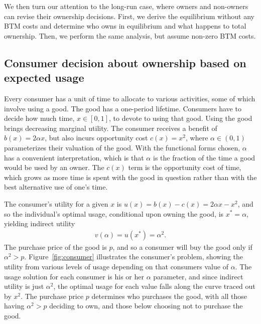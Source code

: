 \documentclass[11pt]{article}
\begin{document}
We then turn our attention to the long-run case, where owners and non-owners can revise their ownership decisions.
First, we derive the equilibrium without any BTM costs and determine who owns in equilibrium and what happens to total ownership.
Then, we perform the same analysis, but assume non-zero BTM costs. 

\subsection{Consumer decision about ownership based on expected usage}  
Every consumer has a unit of time to allocate to various activities, some of which involve using a good.  
The good has a one-period lifetime. 
Consumers have to decide how much time, $x \in [0,1]$, to devote to using that good.
Using the good brings decreasing marginal utility. 
The consumer receives a benefit of $b(x) = 2\alpha x$, but also incurs opportunity cost $c(x) = x^2$,  
where $\alpha \in (0,1)$ parameterizes their valuation of the good.
With the functional forms chosen, $\alpha$ has a convenient interpretation, which is that $\alpha$ is the fraction of the time a good would be used by an owner. 
The $c(x)$ term is the opportunity cost of time, which grows as more time is spent with the good in question rather than with the best alternative use of one's time.

The consumer's utility for a given $x$ is $u(x) = b(x) - c(x) = 2 \alpha x - x^2$, and so the individual's optimal usage, conditional upon owning the good, is $x^* = \alpha$, yielding indirect utility 
\begin{align}
v(\alpha) = u(x^*) = \alpha^2.  
\end{align} 
The purchase price of the good is $p$, and so a consumer will buy the good only if $\alpha^2 > p$. 
Figure~\ref{fig:consumer} illustrates the consumer's problem, showing the utility from various levels of usage depending on that consumers value of $\alpha$.
The usage solution for each consumer is his or her $\alpha$ parameter, and since indirect utility is just $\alpha^2$, the optimal usage for each value falls along the curve traced out by $x^2$.
The purchase price $p$ determines who purchases the good, with all those having $\alpha^2 > p$ deciding to own, and those below choosing not to purchase the good. 

\pgfmathsetmacro{\xstarOne}{\alphaOne}%
%

\pgfmathsetmacro{\xstarTwo}{\alphaTwo}%
%
\end{document}
